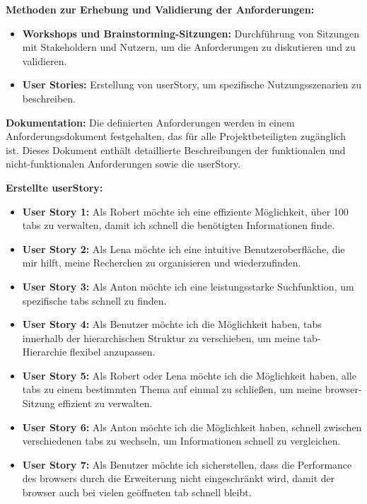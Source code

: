 \textbf{Methoden zur Erhebung und Validierung der Anforderungen:}
\begin{itemize}
    \item \textbf{Workshops und Brainstorming-Sitzungen:} Durchführung von Sitzungen mit Stakeholdern und Nutzern, um die Anforderungen zu diskutieren und zu validieren.
    \item \textbf{User Stories:} Erstellung von \gls{userStory}, um spezifische Nutzungsszenarien zu beschreiben.
\end{itemize}

\textbf{Dokumentation:}
Die definierten Anforderungen werden in einem Anforderungsdokument festgehalten, das für alle Projektbeteiligten zugänglich ist. 
Dieses Dokument enthält detaillierte Beschreibungen der funktionalen und nicht-funktionalen Anforderungen sowie die \gls{userStory}.

\textbf{Erstellte \gls{userStory}:}
\begin{itemize}
    \item \textbf{User Story 1:} Als Robert möchte ich eine effiziente Möglichkeit, über 100 \gls{tab}s zu verwalten, damit ich schnell die benötigten Informationen finde.
    \item \textbf{User Story 2:} Als Lena möchte ich eine intuitive Benutzeroberfläche, die mir hilft, meine Recherchen zu organisieren und wiederzufinden.
    \item \textbf{User Story 3:} Als Anton möchte ich eine leistungsstarke Suchfunktion, um spezifische \gls{tab}s schnell zu finden.
    \item \textbf{User Story 4:} Als Benutzer möchte ich die Möglichkeit haben, \gls{tab}s innerhalb der hierarchischen Struktur zu verschieben, um meine \gls{tab}-Hierarchie flexibel anzupassen.
    \item \textbf{User Story 5:} Als Robert oder Lena möchte ich die Möglichkeit haben, alle \gls{tab}s zu einem bestimmten Thema auf einmal zu schließen, um meine \gls{browser}-Sitzung effizient zu verwalten.
    \item \textbf{User Story 6:} Als Anton möchte ich die Möglichkeit haben, schnell zwischen verschiedenen \gls{tab}s zu wechseln, um Informationen schnell zu vergleichen.
    \item \textbf{User Story 7:} Als Benutzer möchte ich sicherstellen, dass die Performance des \gls{browser}s durch die Erweiterung nicht eingeschränkt wird, damit der \gls{browser} auch bei vielen geöffneten \gls{tab} schnell bleibt.
\end{itemize}